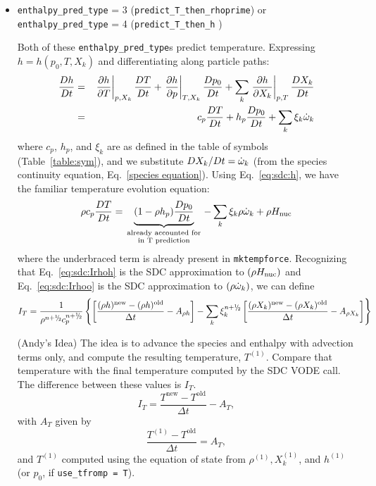 \begin{itemize}
\item {\tt enthalpy\_pred\_type} = 3 ({\tt predict\_T\_then\_rhoprime}) or 
      {\tt enthalpy\_pred\_type} = 4 ({\tt predict\_T\_then\_h} )

Both of these {\tt enthalpy\_pred\_type}s predict temperature.  Expressing
$h = h(p_0,T,X_k)$ and differentiating along particle paths:
\begin{eqnarray}
\frac{Dh}{Dt} &=& \left . \frac{\partial h}{\partial T} \right |_{p,X_k} \frac{DT}{Dt} +
                  \left . \frac{\partial h}{\partial p} \right |_{T,X_k} \frac{Dp_0}{Dt} +
           \sum_k \left . \frac{\partial h}{\partial X_k} \right |_{p,T} \frac{DX_k}{Dt} \\
              &=& c_p \frac{DT}{Dt} + h_p  \frac{Dp_0}{Dt} + \sum_k \xi_k \dot{\omega}_k
\end{eqnarray}
where $c_p$, $h_p$, and $\xi_k$ are as defined in the table of symbols
(Table~\ref{table:sym}), and we substitute $DX_k/Dt = \dot{\omega}_k$ (from the species
continuity equation, Eq.~\ref{species equation}).  Using Eq.~\ref{eq:sdc:h}, we have
the familiar temperature evolution equation:
\begin{equation}
\rho c_p \frac{DT}{Dt} = \underbrace{(1 - \rho h_p) \frac{Dp_0}{Dt}}_{\begin{smallmatrix}\text{already~accounted~for} \\ \text{in~T~prediction}\end{smallmatrix}} - \sum_k \xi_k \rho \dot{\omega}_k + \rho {H_{\rm nuc}}
\end{equation}
where the underbraced term is already present in {\tt mktempforce}.  Recognizing that
Eq.~\ref{eq:sdc:Irhoh} is the SDC approximation to $(\rho {H_{\rm nuc}})$ and Eq.~\ref{eq:sdc:Irhoo} is the 
SDC approximation to $(\rho \dot{\omega}_k)$, we can define
\begin{equation}
I_T = \frac{1}{\rho^{n+\myhalf} c_p^{n+\myhalf}} \left \{
  \left [ \frac{(\rho h)^\mathrm{new} - (\rho h)^\mathrm{old}}{\Delta t} - A_{\rho h} \right ]
  - \sum_k \xi_k^{n+\myhalf} \left [      \frac{(\rho X_k)^\mathrm{new} - 
            (\rho X_k)^\mathrm{old}}{\Delta t} - A_{\rho X_k}  \right ] \right \}
\end{equation}

(Andy's Idea) The idea is to advance the species and enthalpy with advection
terms only, and compute the resulting temperature, $T^{(1)}$.  Compare that temperature
with the final temperature computed by the SDC VODE call.  The difference
between these values is $I_T$.
\begin{equation}
I_T = \frac{T^\mathrm{new} - T^\mathrm{old}}{\Delta t} - A_T,
\end{equation}
with $A_T$ given by
\begin{equation}
\frac{T^{(1)} - T^\mathrm{old}}{\Delta t} = A_T,
\end{equation}
and $T^{(1)}$ computed using the equation of state from $\rho^{(1)}, X_k^{(1)}$, 
and $h^{(1)}$ (or $p_0$, if {\tt use\_tfromp = T}).
\end{itemize}


